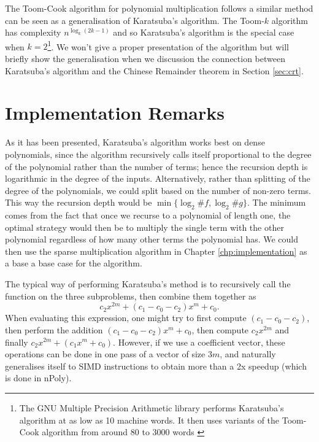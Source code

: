 The Toom-Cook algorithm for polynomial multiplication follows a similar method can be seen as a generalisation of Karatsuba's algorithm. The Toom-$k$ algorithm has complexity $n^{\log_k(2k - 1)}$ and so Karatsuba's algorithm is the special case when $k = 2$\footnote{The GNU Multiple Precision Arithmetic library performs Karatsuba's algorithm at as low as 10 machine words. It then uses variants of the Toom-Cook algorithm from around 80 to 3000 words \cite{gmp-big-num}}. We won't give a proper presentation of the algorithm but will briefly show the generalisation when we discussion the connection between Karatsuba's algorithm and the Chinese Remainder theorem in Section \ref{sec:crt}.

\medskip

\section{Implementation Remarks}

As it has been presented, Karatsuba's algorithm works best on dense polynomials, since the algorithm recursively calls itself proportional to the degree of the polynomial rather than the number of terms; hence the recursion depth is logarithmic in the degree of the inputs. Alternatively, rather than splitting of the degree of the polynomials, we could split based on the number of non-zero terms. This way the recursion depth would be $\min\{\log_2 \# f, \log_2 \# g\}$. The minimum comes from the fact that once we recurse to a polynomial of length one, the optimal strategy would then be to multiply the single term with the other polynomial regardless of how many other terms the polynomial has. We could then use the sparse multiplication algorithm in Chapter \ref{chp:implementation} as a base a base case for the algorithm.

The typical way of performing Karatsuba's method is to recursively call the function on the three subproblems, then combine them together as
\[
    c_2x^{2m} + (c_1 - c_0 - c_2) x^m + c_0.
\]
When evaluating this expression, one might try to first compute $(c_1 - c_0 - c_2)$, then perform the addition $(c_1 - c_0 - c_2)x^m + c_0$, then compute $c_2x^{2m}$ and finally $c_2x^{2m} + (c_1x^m + c_0)$. However, if we use a coefficient vector, these operations can be done in one pass of a vector of size $3m$, and naturally generalises itself to SIMD instructions to obtain more than a 2x speedup (which is done in nPoly).

\medskip

